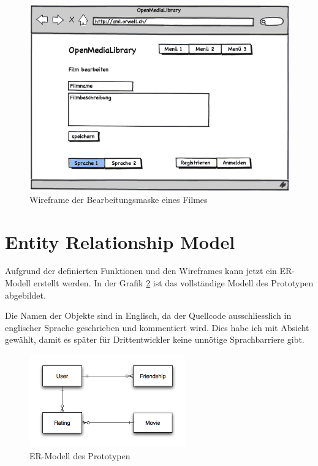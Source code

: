 \begin{figure}[p]
    \begin{center}
        \includegraphics[width=1\textwidth,angle=0]{./wireframes/04_04_edit.png}
        \caption{Wireframe der Bearbeitungsmaske eines Filmes}
        \label{04_04_edit}
    \end{center}
\end{figure}

\clearpage

\section{Entity Relationship Model}
Aufgrund der definierten Funktionen und den Wireframes kann jetzt ein ER-Modell
erstellt werden. In der Grafik \ref{erm} ist das vollständige Modell des Prototypen
abgebildet.

Die Namen der Objekte sind in Englisch, da der Quellcode ausschliesslich in englischer 
Sprache geschrieben und kommentiert wird. Dies habe ich mit Absicht gewählt, 
damit es später für Drittentwickler keine unnötige Sprachbarriere gibt.

\begin{figure}[ht]
    \begin{center}
        \includegraphics[width=0.6\textwidth,angle=0]{./erm/erm.png}
        \caption{ER-Modell des Prototypen}
        \label{erm}
    \end{center}
\end{figure}

